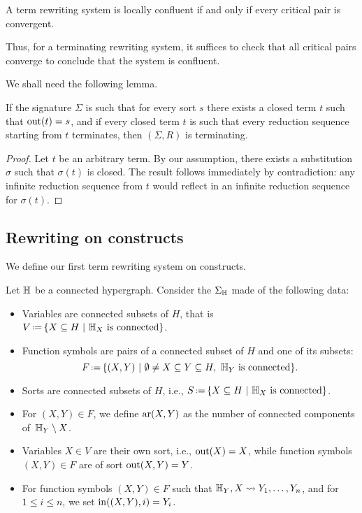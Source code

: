 \begin{lemma}
  \label{l:local-confluence-critical-pair}
  A term rewriting system is locally confluent if and only if every critical pair is convergent. 
\end{lemma}

Thus, for a terminating rewriting system, it suffices to check that all critical pairs converge to conclude that the system is confluent. 

\smallskip
We shall need the following lemma.

\begin{lemma} \label{closed-termination}
If the signature $\Sigma$ is such that for every sort $s$ there exists a closed term $t$ such that $\operatorname{out}(t)=s$, and if  every closed term $t$ is such that every reduction sequence starting from $t$ terminates, then $(\Sigma,R)$ is terminating.
\end{lemma}
\begin{proof} Let $t$ be an arbitrary term. By our assumption, there exists a substitution $\sigma$ such that $\sigma(t)$ is closed. The result follows immediately by contradiction: any infinite reduction sequence from 
$t$ would reflect in an infinite reduction sequence for $\sigma(t)$.
\end{proof}



\subsection{Rewriting on constructs}
\label{ss:rewriting-constructs}
We define our first term rewriting system on constructs. 

\begin{definition} \label{def:signature-hyper}
  Let ${\mathbb H}$ be a connected hypergraph. 
Consider the  $\Sigma_{\mathbb H}$ made of the following data: 
\begin{itemize}
  \item Variables are connected subsets of $H$, that is $V\eqdef \{ X \subseteq H \ | \ \hyper{H}_{X} \text{ is connected}\}$. 
  \item Function symbols are pairs of a connected subset of $H$ and one of its subsets:
  $$F\eqdef \{(X,Y) \ | \ \emptyset \neq X \subseteq Y \subseteq H, \ \hyper{H}_Y \text{ is connected}\}.$$
  \item Sorts are connected subsets of $H$, i.e., $S\eqdef \{ X \subseteq H \ | \ \hyper{H}_X \text{ is connected}\}$.
  \item For $(X,Y) \in F$, we define $\mathrm{ar}(X,Y)$ as the number of connected components of~${\mathbb H}_Y\setminus X$.
  \item Variables $X \in V$ are their own sort, i.e., $\operatorname{out}(X)=X$, while function symbols $(X,Y) \in F$ are of sort $\operatorname{out}(X,Y)=Y$.
  \item For function symbols $(X,Y) \in F$ such that ${\mathbb H}_Y,X \leadsto Y_1,\ldots,Y_n$, and for $1 \leq i \leq n$, we set $\operatorname{in}((X,Y),i)=Y_i$.
\end{itemize}
\end{definition}

